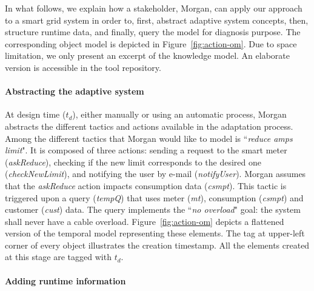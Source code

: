In what follows, we explain how a stakeholder, Morgan, can apply our approach to a smart grid system in order to, first, abstract adaptive system concepts, then, structure runtime data, and finally, query the model for diagnosis purpose.
The corresponding object model is depicted in Figure~\ref{fig:action-om}.
Due to space limitation, we only present an excerpt of the knowledge model.
An elaborate version is accessible in the tool repository.

\paragraph{\textbf{Abstracting the adaptive system}}

At design time ($t_d$), either manually or using an automatic process, Morgan abstracts the different tactics and actions available in the adaptation process.
Among the different tactics that Morgan would like to model is  ``\textit{reduce amps limit}". 
It is composed of three actions: sending a request to the smart meter (\textit{askReduce}), checking if the new limit corresponds to the desired one (\textit{checkNewLimit}), and notifying the user by e-mail (\textit{notifyUser}). 
Morgan assumes that the \textit{askReduce} action impacts consumption data (\textit{csmpt}).
This tactic is triggered upon a query (\textit{tempQ}) that uses meter (\textit{mt}), consumption (\textit{csmpt}) and customer (\textit{cust}) data. The query implements the ``\textit{no overload}" goal: the system shall never have a cable overload. 
Figure~\ref{fig:action-om} depicts a flattened version of the temporal model representing these elements. The tag at upper-left corner of every object illustrates the creation timestamp. All the elements created at this stage are tagged with $t_d$.

\paragraph{\textbf{Adding runtime information}}

